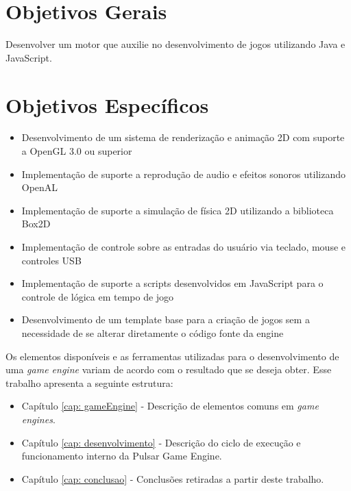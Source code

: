 \documentclass[12pt,	openright, twoside,	a4paper, english, french, spanish, brazil]{abntex2}
\begin{document}
%
%

\section{Objetivos Gerais}
Desenvolver um motor que auxilie no desenvolvimento de jogos utilizando Java e JavaScript.

%
%

\section{Objetivos Específicos}
\begin{itemize}
\item Desenvolvimento de um sistema de renderização e animação 2D com suporte a OpenGL 3.0 ou superior
\item Implementação de suporte a reprodução de audio e efeitos sonoros utilizando OpenAL
\item Implementação de suporte a simulação de física 2D utilizando a biblioteca Box2D
\item Implementação de controle sobre as entradas do usuário via teclado, mouse e controles USB
\item Implementação de suporte a scripts desenvolvidos em JavaScript para o controle de lógica em tempo de jogo
\item Desenvolvimento de um template base para a criação de jogos sem a necessidade de se alterar diretamente o código fonte da engine
\end{itemize}

Os elementos disponíveis e as ferramentas utilizadas para o desenvolvimento de uma \textit{game engine} variam de acordo com o resultado que se deseja obter. 
Esse trabalho apresenta a seguinte estrutura:

\begin{itemize}
\item Capítulo \ref{cap: gameEngine} - Descrição de elementos comuns em \textit{game engines}.
\item Capítulo \ref{cap: desenvolvimento} - Descrição do ciclo de execução e funcionamento interno da Pulsar Game Engine.
\item Capítulo \ref{cap: conclusao} - Conclusões retiradas a partir deste trabalho.
\end{itemize}

%
%
\end{document}
